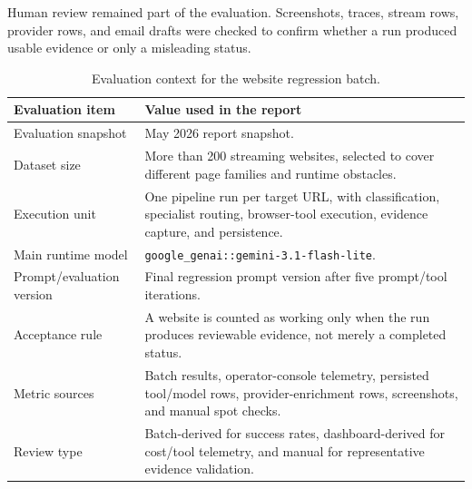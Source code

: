 Human review remained part of the evaluation. Screenshots, traces, stream rows,
provider rows, and email drafts were checked to confirm whether a run produced
usable evidence or only a misleading status.



\begin{table}[!htbp]
\centering
\begin{tabularx}{\textwidth}{Q{4.0cm}Y}
\toprule
{}
Evaluation item & Value used in the report \\
\midrule
Evaluation snapshot & May 2026 report snapshot. \\
Dataset size & More than 200 streaming websites, selected to cover different
page families and runtime obstacles. \\
Execution unit & One pipeline run per target URL, with classification,
specialist routing, browser-tool execution, evidence capture, and persistence. \\
Main runtime model & \texttt{google\_genai::gemini-3.1-flash-lite}. \\
Prompt/evaluation version & Final regression prompt version after five
prompt/tool iterations. \\
Acceptance rule & A website is counted as working only when the run produces
reviewable evidence, not merely a completed status. \\
Metric sources & Batch results, operator-console telemetry, persisted
tool/model rows, provider-enrichment rows, screenshots, and manual spot checks. \\
Review type & Batch-derived for success rates, dashboard-derived for cost/tool
telemetry, and manual for representative evidence validation. \\
\bottomrule
\end{tabularx}
\caption{Evaluation context for the website regression batch.}
\label{tab:evaluation-context}
\end{table}

